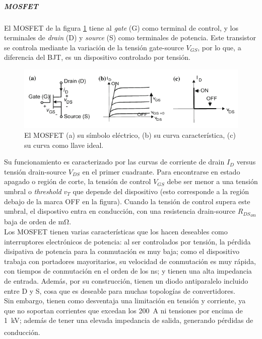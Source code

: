 \subparagraph{MOSFET}

El MOSFET de la figura \ref{mosfet} tiene al \textit{gate} (G) como terminal de control, y los terminales de \textit{drain} (D) y \textit{source} (S) como terminales de potencia. Este transistor se controla mediante la variación de la tensión gate-source $V_{GS}$, por lo que, a diferencia del BJT, es un dispositivo controlado por tensión.\\

\begin{figure}[h]
    \centering
    \includegraphics[scale=0.6]{Imagenes/MOSFET.png}
    \caption{El MOSFET (a) su símbolo eléctrico, (b) su curva característica, (c) su curva como llave ideal.}
    \label{mosfet}
\end{figure}

Su funcionamiento es caracterizado por las curvas de corriente de drain $I_D$ versus tensión drain-source $V_{DS}$ en el primer cuadrante. Para encontrarse en estado apagado o región de corte, la tensión de control $V_{GS}$ debe ser menor a una tensión umbral o \textit{threshold} $v_T$ que depende del dispositivo (esto corresponde a la región debajo de la marca OFF en la figura). Cuando la tensión de control supera este umbral, el dispostivo entra en conducción, con una resistencia drain-source ${R_{DS}}_{on}$ baja de orden de \unit[]{\milli\ohm}.\\

Los MOSFET tienen varias características que los hacen deseables como interruptores electrónicos de potencia: al ser controlados por tensión, la pérdida disipativa de potencia para la conmutación es muy baja; como el dispositivo trabaja con portadores mayoritarios, su velocidad de conmutación es muy rápida, con tiempos de conmutación en el orden de los \unit[]{\nano\second}; y tienen una alta impedancia de entrada. Además, por su construcción, tienen un diodo antiparalelo incluido entre D y S, cosa que es deseable para muchas topologías de convertidores.\\

Sin embargo, tienen como desventaja una limitación en tensión y corriente, ya que no soportan corrientes que excedan los \SI[]{200}[]{\ampere} ni tensiones por encima de \SI[]{1}[]{\kilo\volt}; además de tener una elevada impedancia de salida, generando pérdidas de conducción.\textsuperscript{\cite{PotenciaHart}\cite{PowerElecRenewableEnergySystems}}\\

